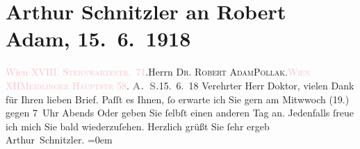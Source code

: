 

               \section[Arthur Schnitzler an Robert Adam, 15. 6. 1918]{ Arthur Schnitzler an Robert Adam, 15. 6. 1918}\nopagebreak{}\rehead{ }\normalsize\beginnumbering{} \toendnotes[C]{\smallbreak\pagebreak[2]} 
\pstart{}{\pb}\textcolor{pink}{Wien XVIII. \textsc{Sternwartestr}. 71}{}\ledrightnote{\textcolor{pink}{VIII., Josefstadt}}.\pend{}{\bigskip}\pstart{}Herrn \textsc{Dr. Robert Adam}\pend{}\pstart{}\textsc{Pollak}.\pend{}\pstart{}\textcolor{pink}{\textsc{Wien} XII}{}\ledrightnote{\textcolor{pink}{XII., Meidling}}\pend{}\pstart{}\textcolor{pink}{\textsc{Meidlinger Hauptstr} 58}{}\ledrightnote{\textcolor{pink}{Meidlinger Hauptstraße}}.\pend{}{\bigskip}\pstart
           \noindent{}{\pb}\textcolor{gray}{\textbf{A. S.}}\hfill 15. 6. 18\pend
           \pstart{}Verehrter Herr Doktor, \pend\pstart
           vielen Dank für Ihren lieben Brief. Paſſt es Ihnen, ſo erwarte ich Sie gern am
                        Mitwwoch (19.) gegen 7 Uhr Abends Oder geben Sie
                    ſelbſt einen anderen Tag an. Jedenfalls ſreue ich mich Sie bald
                    wiederzuſehen.\pend
           \pstart
           Herzlich grüßt Sie ſehr ergeb{\\[\baselineskip]}\spacefill\mbox{Arthur Schnitzler.}\pend
           \leftskip=0em{}\endnumbering{}  
      